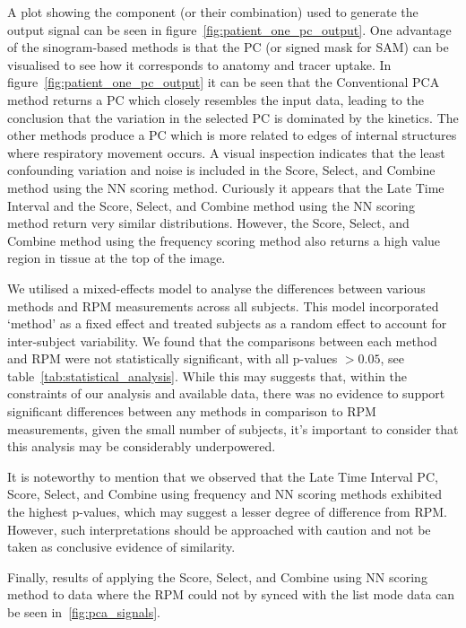     A plot showing the component (or their combination) used to generate the output signal can be seen in figure~\ref{fig:patient_one_pc_output}. One advantage of the sinogram-based methods is that the \gls{PC} (or signed mask for \gls{SAM}) can be visualised to see how it corresponds to anatomy and tracer uptake. In figure~\ref{fig:patient_one_pc_output} it can be seen that the Conventional \gls{PCA} method returns a \gls{PC} which closely resembles the input data, leading to the conclusion that the variation in the selected \gls{PC} is dominated by the kinetics. The other methods produce a \gls{PC} which is more related to edges of internal structures where respiratory movement occurs. A visual inspection indicates that the least confounding variation and noise is included in the Score, Select, and Combine method using the \gls{NN} scoring method. Curiously it appears that the Late Time Interval and the Score, Select, and Combine method using the \gls{NN} scoring method return very similar distributions. However, the Score, Select, and Combine method using the frequency scoring method also returns a high value region in tissue at the top of the image.

    We utilised a mixed-effects model to analyse the differences between various methods and \gls{RPM} measurements across all subjects. This model incorporated `method' as a fixed effect and treated subjects as a random effect to account for inter-subject variability. We found that the comparisons between each method and \gls{RPM} were not statistically significant, with all p-values $> 0.05$, see table~\ref{tab:statistical_analysis}. While this may suggests that, within the constraints of our analysis and available data, there was no evidence to support significant differences between any methods in comparison to \gls{RPM} measurements, given the small number of subjects, it's important to consider that this analysis may be considerably underpowered. 

    It is noteworthy to mention that we observed that the Late Time Interval \gls{PC}, Score, Select, and Combine using frequency and \gls{NN} scoring methods exhibited the highest p-values, which may suggest a lesser degree of difference from \gls{RPM}. However, such interpretations should be approached with caution and not be taken as conclusive evidence of similarity.

    Finally, results of applying the Score, Select, and Combine using \gls{NN} scoring method to data where the \gls{RPM} could not by synced with the list mode data can be seen in~\ref{fig:pca_signals}.
    
